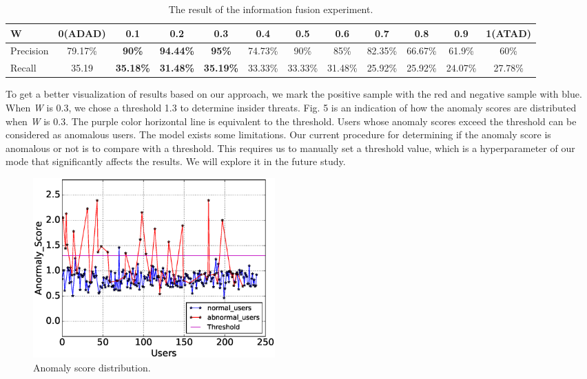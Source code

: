 \documentclass[conference]{IEEEtran}
\begin{document}
\begin{table}[tbp]
\caption{The result of the information fusion experiment.}
\centering  %
\begin{tabular}{lccccccccccc}  %
\hline
W &0(ADAD)&\textbf{0.1} &\textbf{0.2} &\textbf{0.3} &0.4 &0.5 &0.6 &0.7 &0.8 &0.9 &1(ATAD)\\\hline

Precision &79.17\% &\textbf{90\%} &\textbf{94.44\%} &\textbf{95\%}&74.73\%&90\%  &85\% &82.35\% &66.67\%&61.9\%&60\% \\\hline

Recall &35.19 &\textbf{35.18\%} &\textbf{31.48\%} &\textbf{35.19\%}&33.33\%&33.33\%&31.48\%&25.92\%&25.92\%&24.07\%&27.78\%\\\hline
\end{tabular}

\end{table}

To get a better visualization of results based on our approach, we mark the positive sample with the red and negative sample with blue. 
When \emph{W} is 0.3, we chose a threshold 1.3 to determine insider threats.
Fig. 5 is an indication of how the anomaly scores are distributed when \emph{W} is 0.3. 
The purple color horizontal line is equivalent to the threshold.
Users whose anomaly scores exceed the threshold can be considered as anomalous users. The model exists some limitations. Our current procedure for determining if the
anomaly score is anomalous or not is to compare with a threshold. This requires us to manually set a threshold value, which is a hyperparameter of our mode that significantly affects the results. 
We will explore it in the future study. 

\begin{figure}[htb]
\centerline{\includegraphics[width = 0.45\textwidth]{figure/figure8.eps}}
\caption{Anomaly score distribution.}
\label{fig}
\end{figure}
\end{document}
